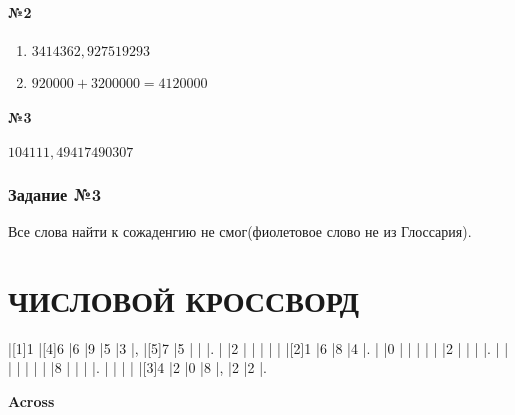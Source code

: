 \documentclass[a4paper, 12pt]{article}
\begin{document}
	\subsection{№2}
	\begin{enumerate}
		\item $3 414 362,927519293$
		\item $920 000 + 3 200 000 = 4 120 000$
	\end{enumerate}
	\subsection{№3}
	$104 111,49417490307$
	\section{Задание №3}
	Все слова найти к сожаденгию не смог(фиолетовое слово не из Глоссария).
	
	\part*{ЧИСЛОВОЙ КРОССВОРД}
	\pagebreak
	\PuzzleSolution
	\begin{Puzzle}{11}{5}
		|[1]1  |[4]6  |6    |9    |5    |3    |,   |[5]7  |5   |{}  |{} |.
		|{}    |2     |{}   |{}   |{}   |{}   |{}  |[2]1  |6   |8   |4  |.
		|{}    |0     |{}   |{}   |{}   |{}   |{}  |2     |{}  |{}  |{} |.
		|{}    |{}    |{}   |{}   |{}   |{}   |{}  |8     |{}  |{}  |{} |.
		|{}    |{}    |{}   |{}   |[3]4 |2    |0   |8     |,   |2   |2  |.
	\end{Puzzle}

	\begin{PuzzleClues}{\textbf{Across}}
	\end{PuzzleClues}
\end{document}
